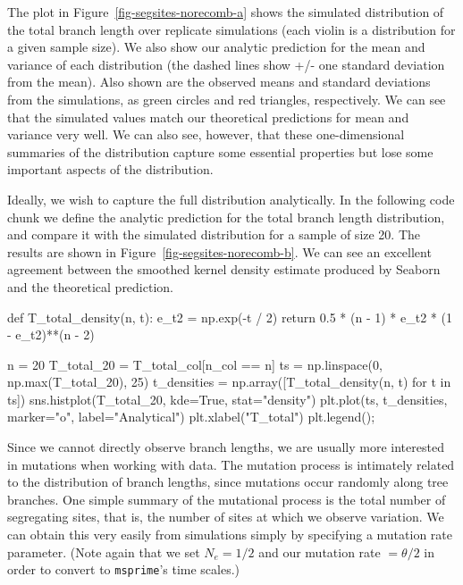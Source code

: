 \documentclass[graybox]{svmult}
\newcommand{\msprime}[0]{\texttt{msprime}}
\begin{document}
    The plot in Figure~\ref{fig-segsites-norecomb-a} shows the simulated
distribution of the total branch length
over replicate simulations (each violin is a distribution for a given
sample size). We also show our analytic prediction for the mean and
variance of each distribution (the dashed lines show +/- one standard
deviation from the mean). Also shown are the observed means and standard
deviations from the simulations, as green circles and red triangles,
respectively. We can see that the simulated values match our theoretical
predictions for mean and variance very well. We can also see, however,
that these one-dimensional summaries of the distribution capture some
essential properties but lose some important aspects of the
distribution.

    Ideally, we wish to capture the full distribution analytically. In the following code chunk we define the analytic
prediction for the total branch length distribution, and compare it with the simulated distribution for a sample of size 20. The results are shown in
Figure~\ref{fig-segsites-norecomb-b}. We can see an excellent agreement between
the smoothed kernel
density estimate produced by Seaborn and the theoretical prediction.

\begin{pythoncode}
def T_total_density(n, t):
    e_t2 = np.exp(-t / 2)
    return 0.5 * (n - 1) * e_t2 * (1 - e_t2)**(n - 2)

n = 20
T_total_20 = T_total_col[n_col == n]
ts = np.linspace(0, np.max(T_total_20), 25)
t_densities = np.array([T_total_density(n, t) for t in ts])
sns.histplot(T_total_20, kde=True, stat="density")
plt.plot(ts, t_densities, marker="o", label="Analytical")
plt.xlabel("T_total")
plt.legend();
\end{pythoncode}

Since we cannot directly observe branch lengths, we are usually more
interested in mutations when working with data. The mutation process is
intimately related to the distribution of branch lengths, since
mutations occur randomly along tree branches. One simple summary of the
mutational process is the total number of segregating sites, that is, the number of
sites at which we observe variation. We can obtain this very
easily from simulations simply by specifying a mutation rate parameter.
(Note again that we set \(N_e=1/2\) and our mutation rate
\(= \theta / 2\) in order to convert to \msprime's time scales.)
\end{document}
